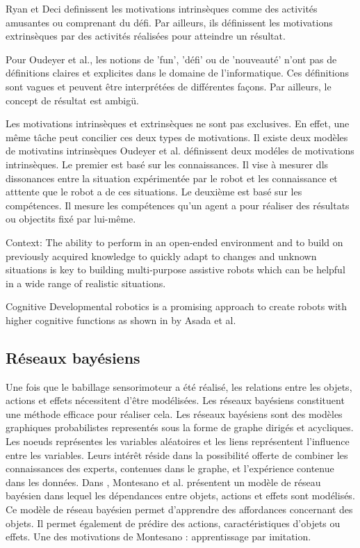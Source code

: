 \documentclass[draft]{llncs}
\begin{document}
Ryan et Deci definissent les motivations intrinsèques comme des activités amusantes ou comprenant du défi.
Par ailleurs, ils définissent les motivations extrinsèques par des activités réalisées pour atteindre un résultat.

Pour Oudeyer et al., les notions de 'fun', 'défi' ou de 'nouveauté' n'ont pas de définitions claires et explicites dans le domaine de l'informatique.
Ces définitions sont vagues et peuvent être interprétées de différentes façons.
Par ailleurs, le concept de résultat est ambigü.

Les motivations intrinsèques et extrinsèques ne sont pas exclusives. En effet, une même tâche peut concilier ces deux types de motivations.
Il existe deux modèles de motivatins intrinsèques
Oudeyer et al. définissent deux modéles de motivations intrinsèques.
Le premier est basé sur les connaissances. Il vise à mesurer dls dissonances entre la situation expérimentée par le robot et les connaissance et atttente que le robot a de ces situations.
Le deuxième est basé sur les compétences. Il mesure les compétences qu'un agent a pour réaliser des résultats ou objectits fixé par lui-même.





Context: The ability to perform in an open-ended environment and to build on previously acquired knowledge to quickly adapt to changes and unknown situations is key to building
multi-purpose assistive robots which can be helpful in a wide range of realistic situations.

Cognitive Developmental robotics is a promising approach to create robots with higher cognitive functions as shown in \cite{Asada2009} by Asada et al.




\subsection{Réseaux bayésiens}

Une fois que le babillage sensorimoteur a été réalisé, les relations entre les objets, actions et effets nécessitent d'être modélisées.
Les réseaux bayésiens constituent une méthode efficace pour réaliser cela. 
Les réseaux bayésiens sont des modèles graphiques probabilistes representés sous la forme de graphe dirigés et acycliques.
Les noeuds représentes les variables aléatoires et les liens représentent l'influence entre les variables.
Leurs intérêt réside dans la possibilité offerte de combiner les connaissances des experts, contenues dans le graphe, et l'expérience contenue dans les données.
Dans \cite{Montesano2008}, Montesano et al. présentent un modèle de réseau bayésien dans lequel les dépendances entre objets, actions et effets sont modélisés.
Ce modèle de réseau bayésien permet d'apprendre des affordances concernant des objets.
Il permet également de prédire des actions, caractéristiques d'objets ou effets.
Une des motivations de Montesano : apprentissage par imitation.
\end{document}
